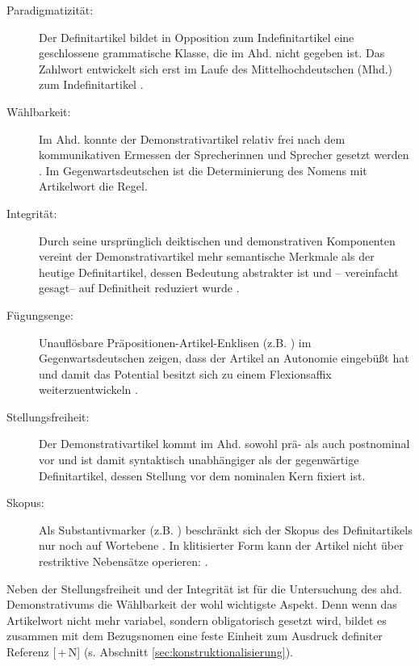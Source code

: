 \begin{description}
\item[Paradigmatizität:] Der Definitartikel bildet in Opposition zum Indefinitartikel eine geschlossene grammatische Klasse, die im Ahd. nicht gegeben ist. Das Zahlwort  entwickelt sich erst im Laufe des Mittelhochdeutschen (Mhd.) zum Indefinitartikel \parencite{Szczepaniak2016}. 
\item[Wählbarkeit:] Im Ahd. konnte der Demonstrativartikel relativ frei nach dem kommunikativen Ermessen der Sprecherinnen und Sprecher gesetzt werden \parencite{Oubouzar1992}. Im Gegenwartsdeutschen ist die Determinierung des Nomens mit Artikelwort die Regel. 
\item[Integrität:] Durch seine ursprünglich deiktischen und demonstrativen Komponenten vereint der Demonstrativartikel mehr semantische Merkmale als der heutige Definitartikel, dessen Bedeutung abstrakter ist und -- vereinfacht gesagt-- auf Definitheit reduziert wurde \parencite[41]{Lehmann2015}.
\item[Fügungsenge:] Unauflösbare Präpositionen-Artikel-Enklisen (z.B. ) im Gegenwartsdeutschen zeigen, dass der Artikel an Autonomie eingebüßt hat und damit das Potential besitzt sich zu einem Flexionsaffix weiterzuentwickeln \parencite[s. hierzu][]{Nubling1992,Nubling2005}.  
\item[Stellungsfreiheit:] Der Demonstrativartikel kommt im Ahd. sowohl prä- als auch postnominal vor \parencite[27--28]{Schrodt2004} und ist damit syntaktisch unabhängiger als der gegenwärtige Definitartikel, dessen Stellung vor dem nominalen Kern fixiert ist. 
\item[Skopus:] Als Substantivmarker (z.B. ) beschränkt sich der Skopus des Definitartikels nur noch auf Wortebene \parencite[71]{Szczepaniak2011a}. In klitisierter Form kann der Artikel nicht über restriktive Nebensätze operieren:  \parencite[112]{Nubling2005}.
\end{description}

\noindent
Neben der Stellungsfreiheit und der Integrität ist für die Untersuchung des ahd. Demonstrativums die Wählbarkeit der wohl wichtigste Aspekt. Denn wenn das Artikelwort nicht mehr variabel, sondern obligatorisch gesetzt wird, bildet es zusammen mit dem Bezugsnomen eine feste Einheit zum Ausdruck definiter Referenz [\,+\,N] (s. Abschnitt \ref{sec:konstruktionalisierung}). 

